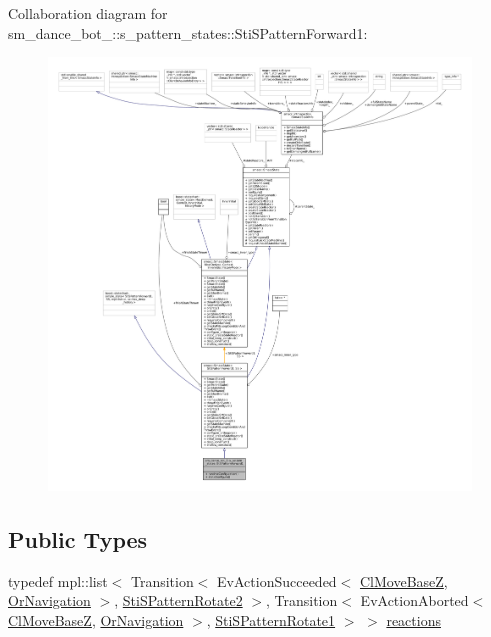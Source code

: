 Collaboration diagram for sm\+\_\+dance\+\_\+bot\+\_\+:\+:s\+\_\+pattern\+\_\+states\+:\+:Sti\+S\+Pattern\+Forward1\+:
\nopagebreak
\begin{figure}[H]
\begin{center}
\leavevmode
\includegraphics[width=350pt]{structsm__dance__bot__3_1_1s__pattern__states_1_1StiSPatternForward1__coll__graph}
\end{center}
\end{figure}
\subsection*{Public Types}
\begin{DoxyCompactItemize}
\item 
typedef mpl\+::list$<$ Transition$<$ Ev\+Action\+Succeeded$<$ \hyperlink{classmove__base__z__client_1_1ClMoveBaseZ}{Cl\+Move\+BaseZ}, \hyperlink{classsm__dance__bot__3_1_1OrNavigation}{Or\+Navigation} $>$, \hyperlink{structsm__dance__bot__3_1_1s__pattern__states_1_1StiSPatternRotate2}{Sti\+S\+Pattern\+Rotate2} $>$, Transition$<$ Ev\+Action\+Aborted$<$ \hyperlink{classmove__base__z__client_1_1ClMoveBaseZ}{Cl\+Move\+BaseZ}, \hyperlink{classsm__dance__bot__3_1_1OrNavigation}{Or\+Navigation} $>$, \hyperlink{structsm__dance__bot__3_1_1s__pattern__states_1_1StiSPatternRotate1}{Sti\+S\+Pattern\+Rotate1} $>$ $>$ \hyperlink{structsm__dance__bot__3_1_1s__pattern__states_1_1StiSPatternForward1_a120c422a7015d8eab46027d489265d06}{reactions}
\end{DoxyCompactItemize}
